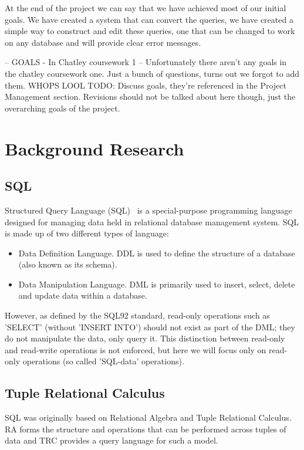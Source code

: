 \documentclass[a4paper, 11pt]{article}
\begin{document}
At the end of the project we can say that we have achieved most of our initial 
goals. We have created a system that can convert the queries, we have created
a simple way to construct and edit these queries, one that can be changed to 
work on any database and will provide clear error messages.

  -- GOALS - In Chatley coursework 1 --
  Unfortunately there aren't any goals in the chatley coursework one.
  Just a bunch of questions, turns out we forgot to add them. WHOPS LOOL
  TODO: Discuss goals, they're referenced in the Project Management
  section. Revisions should not be talked about here though, just the
  overarching goals of the project.

\section{Background Research}
\label{sec:background}
\subsection{SQL}
  Structured Query Language (SQL)~\cite{wiki:SQL} is a special-purpose
  programming language designed for managing data held in relational database
  management system. SQL is made up of two different types of language:

  \begin{itemize}
      \item
        Data Definition Language. DDL is used to define the structure of a
        database (also known as its schema).
      \item
        Data Manipulation Language. DML is primarily used to insert, select,
        delete and update data within a database.
  \end{itemize}

  However, as defined by the SQL92 standard\cite{isoSQL}, read-only operations
  such as 'SELECT' (without 'INSERT INTO') should not exist as part of the DML;
  they do not manipulate the data, only query it. This distinction between
  read-only and read-write operations is not enforced, but here we will focus
  only on read-only operations (so called 'SQL-data' operations).

\subsection{Tuple Relational Calculus}
  SQL was originally based on Relational Algebra and Tuple Relational
  Calculus. RA forms the structure and operations that can be performed
  across tuples of data and TRC provides a query language for such a model.
\end{document}
